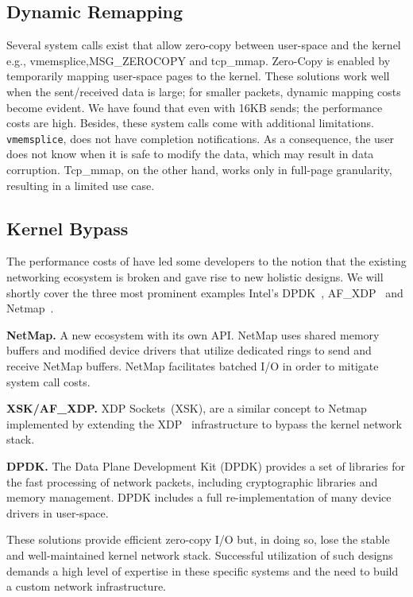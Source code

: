 \subsection{Dynamic Remapping}
Several system calls exist that allow zero-copy between user-space and the kernel e.g., vmemsplice\cite{vmsplice},MSG\_ZEROCOPY\cite{desendmsg} and tcp\_mmap\cite{tcp_mmap}.
Zero-Copy is enabled by temporarily mapping user-space pages to the kernel. These solutions work well when the sent/received data is large; for smaller packets, dynamic mapping costs become evident. We have found that even with 16KB sends; the performance costs are high. Besides, these system calls come with additional limitations. \texttt{vmemsplice}, does not have completion notifications. As a consequence, the user does not know when it is safe to modify the data, which may result in data corruption. Tcp\_mmap, on the other hand, works only in full-page granularity, resulting in a limited use case. 

\subsection{Kernel Bypass}
The performance costs of \sockets have led some developers to the notion that the existing networking ecosystem is broken and gave rise to new holistic designs. We will shortly cover the three most prominent examples Intel's DPDK~\cite{dpdk}, AF\_XDP~\cite{xsk} and Netmap~\cite{rizzo2012netmap}.


\noindent\textbf{NetMap.} A new ecosystem with its own API. NetMap\cite{rizzo2012netmap} uses shared memory buffers and modified device drivers that utilize dedicated rings to send and receive NetMap buffers. NetMap facilitates batched I/O in order to mitigate system call costs.

\noindent \textbf{XSK/AF\_XDP.} XDP Sockets~(XSK), are a similar concept to Netmap implemented by extending the XDP~\cite{xdp} infrastructure to bypass the kernel network stack.

\noindent \textbf{DPDK.}
The Data Plane Development Kit (DPDK)\cite{dpdk} provides a set of libraries for the fast processing of network packets, including cryptographic libraries and memory management. DPDK includes a full re-implementation of many device drivers in user-space.

These solutions provide efficient zero-copy I/O but, in doing so, lose the stable and well-maintained kernel network stack. Successful utilization of such designs demands a high level of expertise in these specific systems and the need to build a custom network infrastructure.

